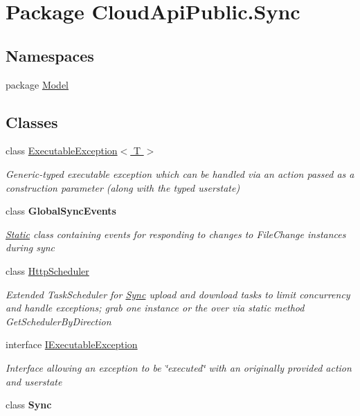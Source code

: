 \hypertarget{namespace_cloud_api_public_1_1_sync}{\section{Package Cloud\-Api\-Public.\-Sync}
\label{namespace_cloud_api_public_1_1_sync}
}
\subsection*{Namespaces}
\begin{DoxyCompactItemize}
\item 
package \hyperlink{namespace_cloud_api_public_1_1_sync_1_1_model}{Model}
\end{DoxyCompactItemize}
\subsection*{Classes}
\begin{DoxyCompactItemize}
\item 
class \hyperlink{class_cloud_api_public_1_1_sync_1_1_executable_exception_3_01_t_01_4}{Executable\-Exception$<$ T $>$}
\begin{DoxyCompactList}\small\item\em Generic-\/typed executable exception which can be handled via an action passed as a construction parameter (along with the typed userstate) \end{DoxyCompactList}\item 
class {\bfseries Global\-Sync\-Events}
\begin{DoxyCompactList}\small\item\em \hyperlink{namespace_cloud_api_public_1_1_static}{Static} class containing events for responding to changes to File\-Change instances during sync \end{DoxyCompactList}\item 
class \hyperlink{class_cloud_api_public_1_1_sync_1_1_http_scheduler}{Http\-Scheduler}
\begin{DoxyCompactList}\small\item\em Extended Task\-Scheduler for \hyperlink{namespace_cloud_api_public_1_1_sync}{Sync} upload and download tasks to limit concurrency and handle exceptions; grab one instance or the over via static method Get\-Scheduler\-By\-Direction \end{DoxyCompactList}\item 
interface \hyperlink{interface_cloud_api_public_1_1_sync_1_1_i_executable_exception}{I\-Executable\-Exception}
\begin{DoxyCompactList}\small\item\em Interface allowing an exception to be \char`\"{}executed\char`\"{} with an originally provided action and userstate \end{DoxyCompactList}\item 
class {\bfseries Sync}
\end{DoxyCompactItemize}
